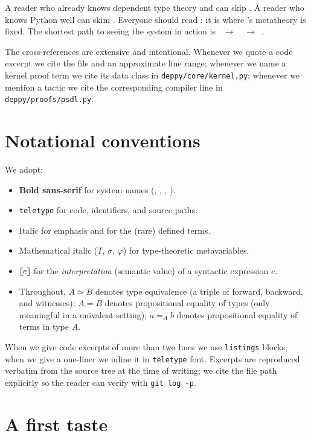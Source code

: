 A reader who already knows dependent type theory and \Lean{} can
skip .  A reader who knows Python well can skim
.  Everyone should read : it is
where \Deppy{}'s metatheory is fixed.  The shortest path to seeing
the system in action is
~$\to$~~$\to$~.

The cross-references are extensive and intentional.  Whenever we
quote a code excerpt we cite the file and an approximate line
range; whenever we name a kernel proof term we cite its data class
in \texttt{deppy/core/kernel.py}; whenever we mention a tactic we
cite the corresponding \PSDL{} compiler line in
\texttt{deppy/proofs/psdl.py}.

\section{Notational conventions}
\label{sec:notation}

We adopt:
\begin{itemize}[leftmargin=1.7em]
  \item \textbf{Bold sans-serif} for system names (\Deppy{}, \PSDL{},
    \Lean{}, \Zthree).
  \item \texttt{teletype} for code, identifiers, and source paths.
  \item Italic for emphasis and for the (rare) defined terms.
  \item Mathematical italic ($T$, $\sigma$, $\varphi$) for type-theoretic
    metavariables.
  \item $\llbracket e \rrbracket$ for the \emph{interpretation} (semantic value) of a
    syntactic expression $e$.
  \item Throughout, $A \simeq B$ denotes type equivalence (a triple
    of forward, backward, and witnesses); $A = B$ denotes propositional
    equality of types (only meaningful in a univalent setting); $a =_A b$
    denotes propositional equality of terms in type $A$.
\end{itemize}

When we give code excerpts of more than two lines we use
\texttt{listings} blocks; when we give a one-liner we inline it in
\texttt{teletype} font.  Excerpts are reproduced verbatim from the
source tree at the time of writing; we cite the file path
explicitly so the reader can verify with \texttt{git log -p}.

\section{A first taste}
\label{sec:first-taste}


